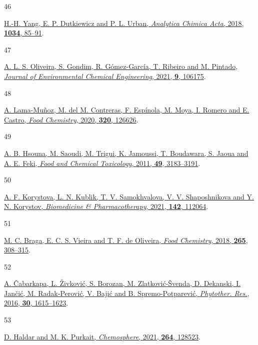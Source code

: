 \documentclass[
  letterpaper,
  DIV=11,
  numbers=noendperiod]{scrartcl}
\newlength{\cslhangindent}
\newlength{\csllabelwidth}
\newenvironment{CSLReferences}[2] %
 {\begin{list}{}{%
  \setlength{\itemindent}{0pt}
  \setlength{\leftmargin}{0pt}
  \setlength{\parsep}{0pt}
  \ifodd #1
   \setlength{\leftmargin}{\cslhangindent}
   \setlength{\itemindent}{-1\cslhangindent}
  \fi
  \setlength{\itemsep}{#2\baselineskip}}}
 {\end{list}}
\newcommand{\CSLLeftMargin}[1]{\parbox[t]{\csllabelwidth}{\strut#1\strut}}
\newcommand{\CSLRightInline}[1]{\parbox[t]{\linewidth - \csllabelwidth}{\strut#1\strut}}
\begin{document}
\begin{CSLReferences}{0}{0}
\CSLLeftMargin{46 }%
\CSLRightInline{\href{https://doi.org/10.1016/j.aca.2018.06.072}{H.-H.
Yang, E. P. Dutkiewicz and P. L. Urban, \emph{Analytica Chimica Acta},
2018, \textbf{1034}, 85--91}.}

\CSLLeftMargin{47 }%
\CSLRightInline{\href{https://doi.org/10.1016/j.jece.2021.106175}{A. L.
S. Oliveira, S. Gondim, R. Gómez-García, T. Ribeiro and M. Pintado,
\emph{Journal of Environmental Chemical Engineering}, 2021, \textbf{9},
106175}.}

\CSLLeftMargin{48 }%
\CSLRightInline{\href{https://doi.org/10.1016/j.foodchem.2020.126626}{A.
Lama-Muñoz, M. del M. Contreras, F. Espínola, M. Moya, I. Romero and E.
Castro, \emph{Food Chemistry}, 2020, \textbf{320}, 126626}.}

\CSLLeftMargin{49 }%
\CSLRightInline{\href{https://doi.org/10.1016/j.fct.2011.09.034}{A. B.
Hsouna, M. Saoudi, M. Trigui, K. Jamoussi, T. Boudawara, S. Jaoua and A.
E. Feki, \emph{Food and Chemical Toxicology}, 2011, \textbf{49},
3183--3191}.}

\CSLLeftMargin{50 }%
\CSLRightInline{\href{https://doi.org/10.1016/j.biopha.2021.112064}{A.
F. Korystova, L. N. Kublik, T. V. Samokhvalova, V. V. Shaposhnikova and
Y. N. Korystov, \emph{Biomedicine \& Pharmacotherapy}, 2021,
\textbf{142}, 112064}.}

\CSLLeftMargin{51 }%
\CSLRightInline{\href{https://doi.org/10.1016/j.foodchem.2018.05.096}{M.
C. Braga, E. C. S. Vieira and T. F. de Oliveira, \emph{Food Chemistry},
2018, \textbf{265}, 308--315}.}

\CSLLeftMargin{52 }%
\CSLRightInline{\href{https://doi.org/10.1002/ptr.5662}{A. Čabarkapa, L.
Živković, S. Borozan, M. Zlatković-Švenda, D. Dekanski, I. Jančić, M.
Radak-Perović, V. Bajić and B. Spremo-Potparević, \emph{Phytother.
Res.}, 2016, \textbf{30}, 1615--1623}.}

\CSLLeftMargin{53 }%
\CSLRightInline{\href{https://doi.org/10.1016/j.chemosphere.2020.128523}{D.
Haldar and M. K. Purkait, \emph{Chemosphere}, 2021, \textbf{264},
128523}.}


\end{CSLReferences}
\end{document}
